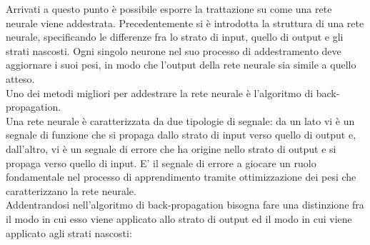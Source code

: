 Arrivati a questo punto è possibile esporre la trattazione su come una rete neurale viene addestrata. Precedentemente si è introdotta la struttura di una rete neurale, specificando le differenze fra lo strato di input, quello di output e gli strati nascosti. Ogni singolo neurone nel suo processo di addestramento deve aggiornare i suoi pesi, in modo che l'output della rete neurale sia simile a quello atteso.\\
Uno dei metodi migliori per addestrare la rete neurale è l'algoritmo di back-propagation. \\
Una rete neurale è caratterizzata da due tipologie di segnale: da un lato vi è un segnale di funzione che si propaga dallo strato di input verso quello di output e, dall'altro, vi è un segnale di errore che ha origine nello strato di output e si propaga verso quello di input. E' il segnale di errore a giocare un ruolo fondamentale nel processo di apprendimento tramite ottimizzazione dei pesi che caratterizzano la rete neurale. \\
Addentrandosi nell'algoritmo di back-propagation bisogna fare una distinzione fra il modo in cui esso viene applicato allo strato di output ed il modo in cui viene applicato agli strati nascosti:
